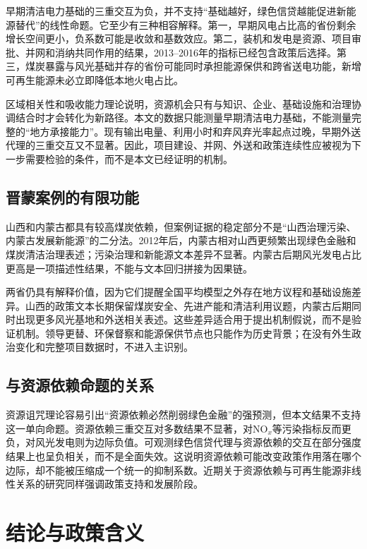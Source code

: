 \documentclass[UTF8,12pt]{ctexart}
\begin{document}
早期清洁电力基础的三重交互为负，并不支持“基础越好，绿色信贷越能促进新能源替代”的线性命题。它至少有三种相容解释。第一，早期风电占比高的省份剩余增长空间更小，负系数可能是收敛和基数效应。第二，装机和发电是资源、项目审批、并网和消纳共同作用的结果，2013--2016年的指标已经包含政策后选择。第三，煤炭暴露与风光基础并存的省份可能同时承担能源保供和跨省送电功能，新增可再生能源未必立即降低本地火电占比。

区域相关性和吸收能力理论说明，资源机会只有与知识、企业、基础设施和治理协调结合时才会转化为新路径\parencite{cohenlevinthal1990,boschma2017,santoalhaboschma2021,zhaoetal2026}。本文的数据只能测量早期清洁电力基础，不能测量完整的“地方承接能力”。现有输出电量、利用小时和弃风弃光率起点过晚，早期外送代理的三重交互又不显著。因此，项目建设、并网、外送和政策连续性应被视为下一步需要检验的条件，而不是本文已经证明的机制。

\subsection{晋蒙案例的有限功能}

山西和内蒙古都具有较高煤炭依赖，但案例证据的稳定部分不是“山西治理污染、内蒙古发展新能源”的二分法。2012年后，内蒙古相对山西更频繁出现绿色金融和煤炭清洁治理表述；污染治理和新能源文本差异不显著。内蒙古后期风光发电占比更高是一项描述性结果，不能与文本回归拼接为因果链。

两省仍具有解释价值，因为它们提醒全国平均模型之外存在地方议程和基础设施差异。山西的政策文本长期保留煤炭安全、先进产能和清洁利用议题，内蒙古后期同时出现更多风光基地和外送相关表述。这些差异适合用于提出机制假说，而不是验证机制。领导更替、环保督察和能源保供节点也只能作为历史背景；在没有外生政治变化和完整项目数据时，不进入主识别。

\subsection{与资源依赖命题的关系}

资源诅咒理论容易引出“资源依赖必然削弱绿色金融”的强预测，但本文结果不支持这一单向命题。资源依赖三重交互对多数结果不显著，对NO$_x$等污染指标反而更负，对风光发电则为边际负值。可观测绿色信贷代理与资源依赖的交互在部分强度结果上也呈负相关，而不是全面失效。这说明资源依赖可能改变政策作用落在哪个边际，却不能被压缩成一个统一的抑制系数。近期关于资源依赖与可再生能源非线性关系的研究同样强调政策支持和发展阶段\parencite{zhangetal2024resource}。

\section{结论与政策含义}
\end{document}
